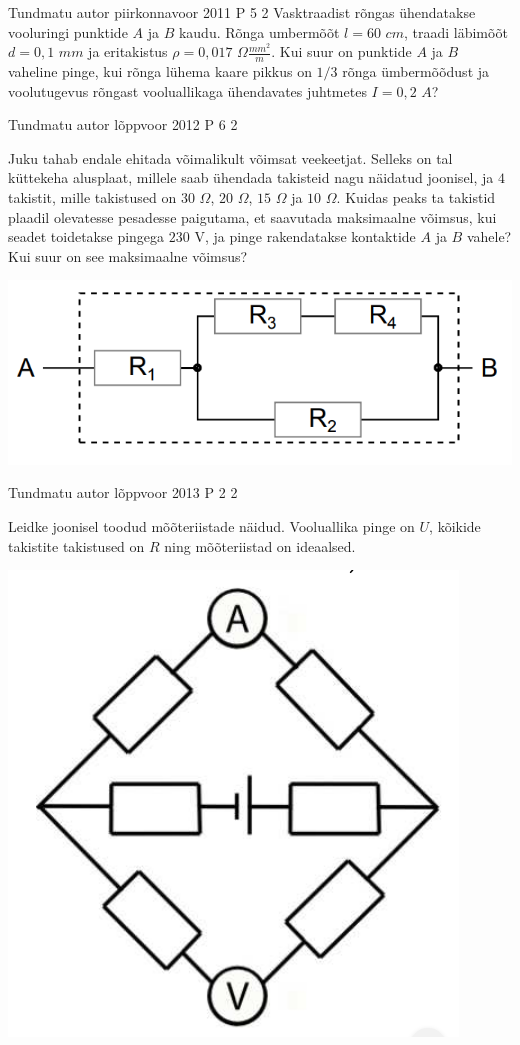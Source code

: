 \documentclass[11pt]{article}
\begin{document}
{%
{Tundmatu autor} %
{piirkonnavoor} %
{2011} %
{P 5} %
{2} %
{
\ifStatement
Vasktraadist rõngas ühendatakse vooluringi punktide $A$ ja $B$ kaudu. Rõnga umbermõõt  $l = 60$ $cm$, traadi läbimõõt $d = 0,1$ $mm$ ja eritakistus $\rho = 0,017$ $\Omega \frac{mm^2}{m}$. Kui suur on punktide $A$ ja $B$ vaheline pinge, kui rõnga lühema kaare pikkus on $1/3$ rõnga ümbermõõdust ja voolutugevus rõngast vooluallikaga ühendavates juhtmetes $I = 0,2$ $A$?
\fi
}


{Tundmatu autor} %
{lõppvoor} %
{2012} %
{P 6} %
{2} %
{
\ifStatement
Juku tahab endale ehitada võimalikult võimsat veekeetjat. Selleks on tal küttekeha alusplaat, millele saab ühendada takisteid nagu näidatud joonisel, ja $4$ takistit, mille takistused on $30$ $\Omega$, $20$ $\Omega$, $15$ $\Omega$ ja $10$ $\Omega$. Kuidas peaks ta takistid plaadil olevatesse pesadesse paigutama, et saavutada maksimaalne võimsus, kui seadet toidetakse pingega $230$ V, ja pinge rakendatakse kontaktide $A$ ja $B$ vahele? Kui suur on see maksimaalne võimsus?
\begin{center}
	\includegraphics[width=0.5\linewidth]{2012-v3p-06-yl.png}
\end{center}
\fi
}

{Tundmatu autor} %
{lõppvoor} %
{2013} %
{P 2} %
{2} %
{
\ifStatement
Leidke joonisel toodud mõõteriistade näidud. Vooluallika pinge on $U$, kõikide takistite takistused on $R$ ning mõõteriistad on ideaalsed.
\begin{center}
	\includegraphics[width=0.5\linewidth]{2013-v3p-02-yl.png}
\end{center}
\fi
}

}
\end{document}
